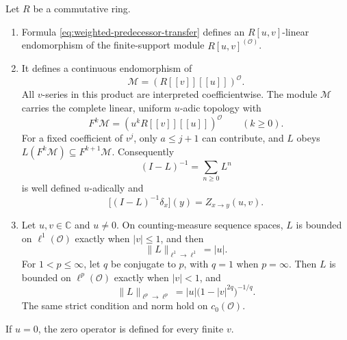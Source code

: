 \begin{theorem}
\label{thm:weighted-transfer-exact-domains}
Let $R$ be a commutative ring.

\begin{enumerate}[label=\textup{(\roman*)}]
\item Formula \eqref{eq:weighted-predecessor-transfer} defines an
$R[u,v]$-linear endomorphism of the finite-support module
$R[u,v]^{(\mathcal O)}$.

\item It defines a continuous endomorphism of
\[
 \mathcal M=(R[[v]][[u]])^{\mathcal O}.
\]
All $v$-series in this product are interpreted coefficientwise.  The module
$\mathcal M$ carries the complete linear, uniform $u$-adic topology with
\[
 F^k\mathcal M=(u^kR[[v]][[u]])^{\mathcal O}\qquad(k\geq0).
\]
For a fixed coefficient of $v^j$, only $a\leq j+1$ can contribute, and $L$
obeys $L(F^k\mathcal M)\subseteq F^{k+1}\mathcal M$.  Consequently
\[
 (I-L)^{-1}=\sum_{n\geq0}L^n
\]
is well defined $u$-adically and
\begin{equation}
\label{eq:transfer-endpoint-kernel}
 \bigl[(I-L)^{-1}\delta_x\bigr](y)=Z_{x\to y}(u,v).
\end{equation}

\item Let $u,v\in\mathbb C$ and $u\ne0$.  On counting-measure sequence
spaces, $L$ is bounded on $\ell^1(\mathcal O)$ exactly when $|v|\leq1$, and
then
\[
 \lVert L\rVert_{\ell^1\to\ell^1}=|u|.
\]
For $1<p\leq\infty$, let $q$ be conjugate to $p$, with $q=1$ when
$p=\infty$.  Then $L$ is bounded on $\ell^p(\mathcal O)$ exactly when
$|v|<1$, and
\begin{equation}
\label{eq:weighted-transfer-lp-norm}
 \lVert L\rVert_{\ell^p\to\ell^p}
 =|u|\bigl(1-|v|^{2q}\bigr)^{-1/q}.
\end{equation}
The same strict condition and norm hold on $c_0(\mathcal O)$.
\end{enumerate}
If $u=0$, the zero operator is defined for every finite $v$.
\end{theorem}


